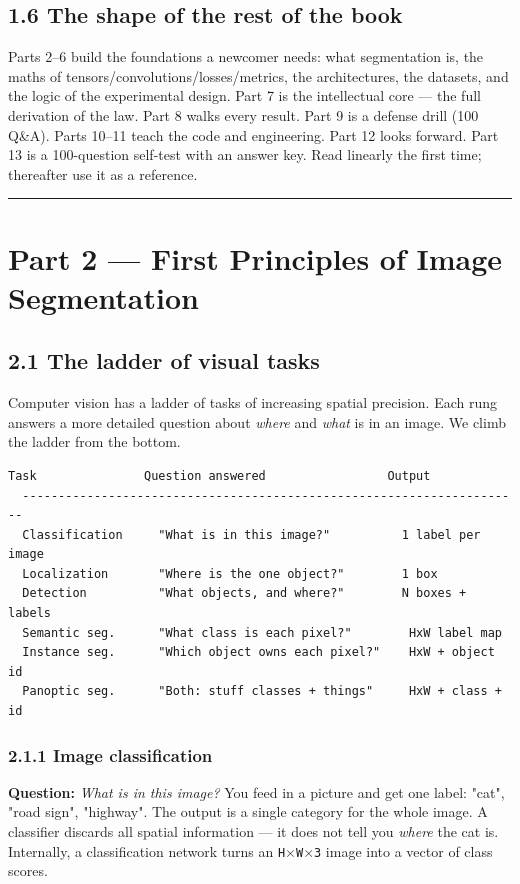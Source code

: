 \documentclass[11pt]{article}
\begin{document}
\subsection*{1.6 The shape of the rest of the book}

Parts 2--6 build the foundations a newcomer needs: what segmentation is, the maths of tensors/convolutions/losses/metrics, the architectures, the datasets, and the logic of the experimental design. Part 7 is the intellectual core --- the full derivation of the law. Part 8 walks every result. Part 9 is a defense drill (100 Q\&A). Parts 10--11 teach the code and engineering. Part 12 looks forward. Part 13 is a 100-question self-test with an answer key. Read linearly the first time; thereafter use it as a reference.

\vspace{3pt}\hrule\vspace{3pt}
\clearpage\section*{Part 2 --- First Principles of Image Segmentation}

\subsection*{2.1 The ladder of visual tasks}

Computer vision has a ladder of tasks of increasing spatial precision. Each rung answers a more detailed question about \textit{where} and \textit{what} is in an image. We climb the ladder from the bottom.

\begin{Verbatim}[breaklines=true,breakanywhere=true,fontsize=\footnotesize]
  Task               Question answered                 Output
  ----------------------------------------------------------------------
  Classification     "What is in this image?"          1 label per image
  Localization       "Where is the one object?"        1 box
  Detection          "What objects, and where?"        N boxes + labels
  Semantic seg.      "What class is each pixel?"        HxW label map
  Instance seg.      "Which object owns each pixel?"    HxW + object id
  Panoptic seg.      "Both: stuff classes + things"     HxW + class + id
\end{Verbatim}

\subsubsection*{2.1.1 Image classification}
\textbf{Question:} \textit{What is in this image?} You feed in a picture and get one label: "cat", "road sign", "highway". The output is a single category for the whole image. A classifier discards all spatial information --- it does not tell you \textit{where} the cat is. Internally, a classification network turns an \texttt{H$\times$W$\times$3} image into a vector of class scores.
\end{document}
